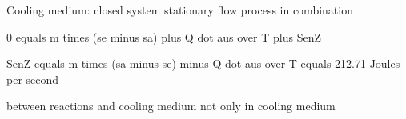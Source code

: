Cooling medium: closed system stationary flow process in combination

0 equals m times (se minus sa) plus Q dot aus over T plus SenZ

SenZ equals m times (sa minus se) minus Q dot aus over T equals 212.71 Joules per second

between reactions and cooling medium not only in cooling medium